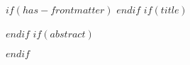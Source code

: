 $if(has-frontmatter)$
\frontmatter
$endif$
$if(title)$
\maketitle
$endif$
$if(abstract)$
\begin{abstract}
$abstract$
$if(keywords)$
$endif$
\end{abstract}
$endif$
